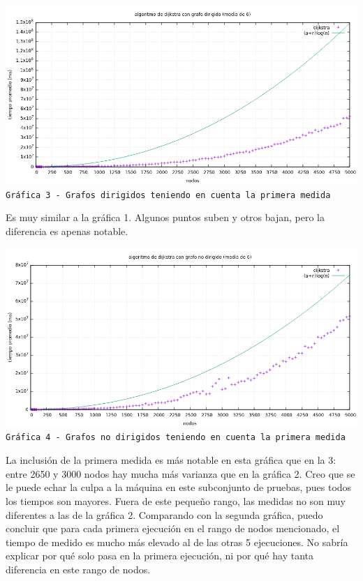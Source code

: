 \documentclass[12pt , a4paper]{article}
\begin{document}
	\newpage
	\hspace*{-.15\linewidth}
	\includegraphics[width=1.25\hsize]{dir6.png}
	\texttt{Gráfica 3 - Grafos dirigidos teniendo en cuenta la primera medida}
	\newline
	
	Es muy similar a la gráfica 1. Algunos puntos suben y otros bajan, pero la diferencia es apenas notable.
	
	
	\newpage
	\hspace*{-.15\linewidth}
	\includegraphics[width=1.25\hsize]{nodir6.png}
	\texttt{Gráfica 4 - Grafos no dirigidos teniendo en cuenta la primera medida}
	\newline
	
	La inclusión de la primera medida es más notable en esta gráfica que en la 3: entre 2650 y 3000 nodos hay mucha más varianza que en la gráfica 2. Creo que se le puede echar la culpa a la máquina en este subconjunto de pruebas, pues todos los tiempos son mayores. Fuera de este pequeño rango, las medidas no son muy diferentes a las de la gráfica 2.
	Comparando con la segunda gráfica, puedo concluir que para cada primera ejecución en el rango de nodos mencionado, el tiempo de medido es mucho más elevado al de las otras 5 ejecuciones. No sabría explicar por qué solo pasa en la primera ejecución, ni por qué hay tanta diferencia en este rango de nodos.
\end{document}
